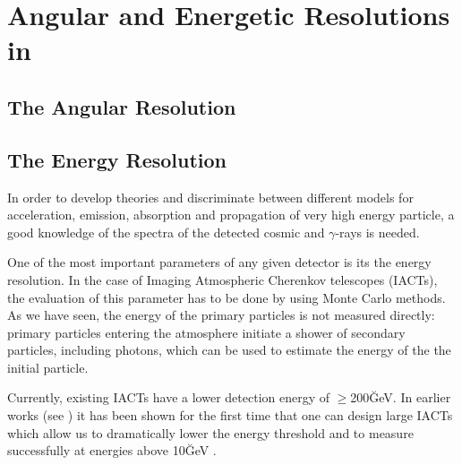 

\def\SIZE{\mbox{\scshape size}\xspace}
\def\LENGTH{\mbox{\scshape length}\xspace}
\def\WIDTH{\mbox{\scshape width}\xspace}
\def\DISTANCE{\mbox{\scshape distance}\xspace}

\chapter{Angular and Energetic Resolutions in \MAGIC}
\label{chapter:resol}

\section{The Angular Resolution}

\section{The Energy Resolution}

In order to develop theories and discriminate between different models
for acceleration, emission, absorption and propagation of very high
energy particle, a good knowledge of the spectra of the detected
cosmic and $\gamma$-rays is needed.  

One of the most important parameters of any given detector is its the
energy resolution.  In the case of Imaging Atmospheric Cherenkov
telescopes (IACTs), the evaluation of this parameter has to be done by
using Monte Carlo methods.  As we have seen, the energy of the primary
particles is not measured directly: primary particles entering the
atmosphere initiate a shower of secondary particles, including
\Cherenkov photons, which can be used to estimate the energy of the
the initial particle.

Currently, existing IACTs have a lower detection energy of
$\geq$200\u{GeV}.  In earlier works (see \cite{MAGIC:Gonzalez_Kruger})
it has been shown for the first time that one can design large IACTs
which allow us to dramatically lower the energy threshold and to
measure successfully at energies above 10\u{GeV} \cite{MAGIC:DR}.


